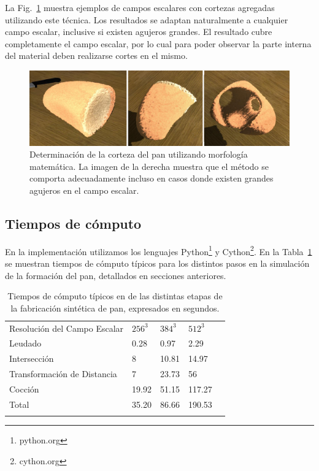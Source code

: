 La Fig.~\ref{fg:crusts} muestra ejemplos de campos escalares con cortezas agregadas utilizando este técnica. Los resultados se adaptan naturalmente a cualquier campo escalar, inclusive si existen agujeros grandes.
El resultado cubre completamente el campo escalar, por lo cual para poder observar la parte interna del material deben realizarse cortes en el mismo.

\begin{figure}
  \centerline{\includegraphics[width=13cm]{figures/crusts}}
  \caption[Determinación de la corteza del pan utilizando morfología matemática]{Determinación de la corteza del pan utilizando morfología matemática. La imagen de la derecha muestra que el método se comporta adecuadamente incluso en casos donde existen grandes agujeros en el campo escalar.}
  \label{fg:crusts}
\end{figure}

\subsection{Tiempos de cómputo}
En la implementación utilizamos los lenguajes Python\footnote{python.org} y Cython\footnote{cython.org}.
En la Tabla~\ref{tab:computingtimes} se muestran tiempos de cómputo típicos para los distintos pasos en la simulación de la formación del pan, detallados en secciones anteriores. %

\begin{table}[h!]
\begin{tabular}{lllll}
\hline\noalign{\smallskip}
Resolución del Campo Escalar & $256^{3}$ & $384^{3}$  & $512^{3}$ \\
\noalign{\smallskip}\hline\noalign{\smallskip}
Leudado & 0.28 & 0.97 & 2.29 \\
Intersección & 8 & 10.81 & 14.97 \\
Transformación de Distancia & 7 & 23.73 & 56 \\
Cocción & 19.92 & 51.15 & 117.27 \\
\hline\noalign{\smallskip}
Total & 35.20 & 86.66 & 190.53 \\
\noalign{\smallskip}\hline
\end{tabular}
\caption{Tiempos de cómputo típicos en de las distintas etapas de la fabricación sintética de pan, expresados en segundos.}
\label{tab:computingtimes}
\end{table}

